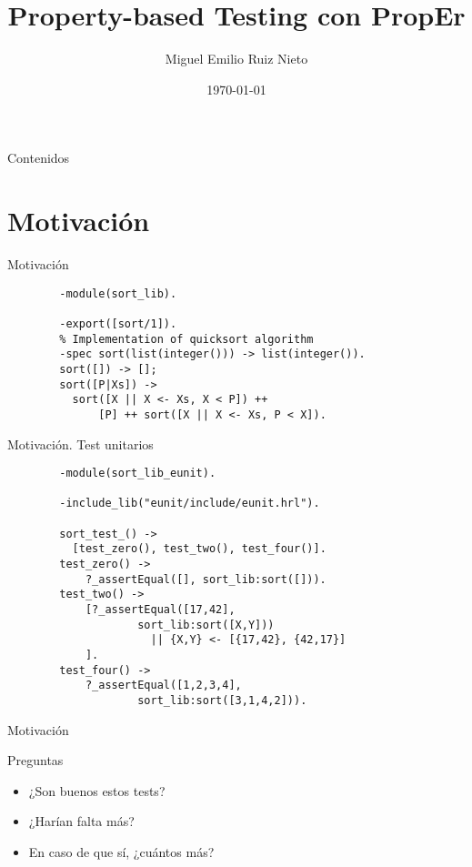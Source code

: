 \documentclass{beamer}
\title[ACFI]{Property-based Testing con PropEr}
\author{Miguel Emilio Ruiz Nieto}
\date{\today} %
\begin{document}
  \begin{frame}
    \titlepage
  \end{frame}

  \begin{frame}{Contenidos}
    \tableofcontents[hideallsubsections]
  \end{frame}

  \section{Motivación}
    \begin{frame}[fragile]{Motivación}
      \begin{verbatim}
        -module(sort_lib).

        -export([sort/1]).
        % Implementation of quicksort algorithm
        -spec sort(list(integer())) -> list(integer()).
        sort([]) -> [];
        sort([P|Xs]) ->
          sort([X || X <- Xs, X < P]) ++
              [P] ++ sort([X || X <- Xs, P < X]).
      \end{verbatim}
    \end{frame}
    \begin{frame}[fragile]{Motivación. Test unitarios}
      \begin{verbatim}
        -module(sort_lib_eunit).

        -include_lib("eunit/include/eunit.hrl").

        sort_test_() ->
          [test_zero(), test_two(), test_four()].
        test_zero() ->
            ?_assertEqual([], sort_lib:sort([])).
        test_two() ->
            [?_assertEqual([17,42],
                    sort_lib:sort([X,Y]))
                      || {X,Y} <- [{17,42}, {42,17}]
            ].
        test_four() ->
            ?_assertEqual([1,2,3,4],
                    sort_lib:sort([3,1,4,2])).
      \end{verbatim}
    \end{frame}
    \begin{frame}{Motivación}
      \begin{block}{Preguntas}
        \begin{itemize}
          \item ¿Son buenos estos tests?
          \item ¿Harían falta más?
          \item En caso de que sí, ¿cuántos más?
        \end{itemize}
      \end{block}
    \end{frame}
\end{document}
